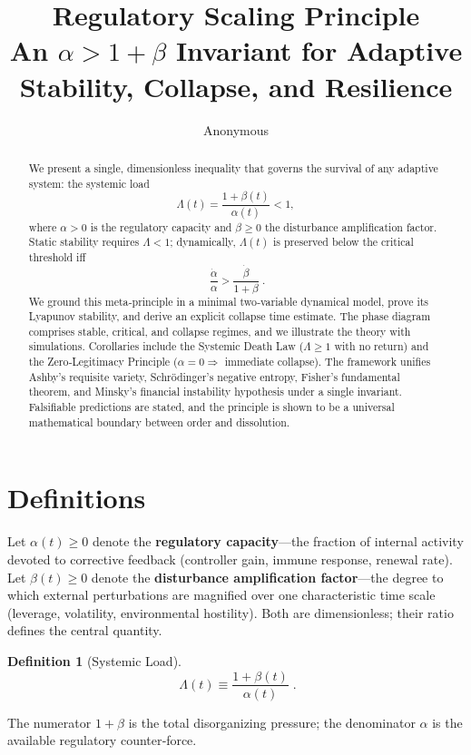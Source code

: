 \documentclass[11pt]{article}
\title{\textbf{Regulatory Scaling Principle}\\[4pt]
\small An \(\alpha>1+\beta\) Invariant for Adaptive Stability, Collapse, and Resilience}
\author{Anonymous}
\date{}
\newtheorem{definition}[theorem]{Definition}
\begin{document}
\maketitle

\begin{abstract}
We present a single, dimensionless inequality that governs the survival of any adaptive system: the systemic load
\[
\Lambda(t)=\frac{1+\beta(t)}{\alpha(t)}<1,
\]
where \(\alpha>0\) is the regulatory capacity and \(\beta\ge0\) the disturbance amplification factor.
Static stability requires \(\Lambda<1\); dynamically, \(\Lambda(t)\) is preserved below the critical threshold iff
\[
\boxed{\;\frac{\dot\alpha}{\alpha} > \frac{\dot\beta}{1+\beta}\;} .
\]
We ground this meta‑principle in a minimal two‑variable dynamical model, prove its Lyapunov stability, and derive an explicit collapse time estimate.
The phase diagram comprises stable, critical, and collapse regimes, and we illustrate the theory with simulations.
Corollaries include the Systemic Death Law (\(\Lambda\ge1\) with no return) and the Zero‑Legitimacy Principle (\(\alpha=0\Rightarrow\) immediate collapse).
The framework unifies Ashby's requisite variety, Schrödinger's negative entropy, Fisher's fundamental theorem, and Minsky's financial instability hypothesis under a single invariant.
Falsifiable predictions are stated, and the principle is shown to be a universal mathematical boundary between order and dissolution.
\end{abstract}

\section{Definitions}
\label{sec:def}
Let \(\alpha(t)\ge0\) denote the \textbf{regulatory capacity}—the fraction of internal activity devoted to corrective feedback (controller gain, immune response, renewal rate).
Let \(\beta(t)\ge0\) denote the \textbf{disturbance amplification factor}—the degree to which external perturbations are magnified over one characteristic time scale (leverage, volatility, environmental hostility).
Both are dimensionless; their ratio defines the central quantity.

\begin{definition}[Systemic Load]
\[
\boxed{\;\Lambda(t) \equiv \frac{1+\beta(t)}{\alpha(t)}\;} .
\]
\end{definition}
The numerator \(1+\beta\) is the total disorganizing pressure; the denominator \(\alpha\) is the available regulatory counter‑force.
\end{document}
